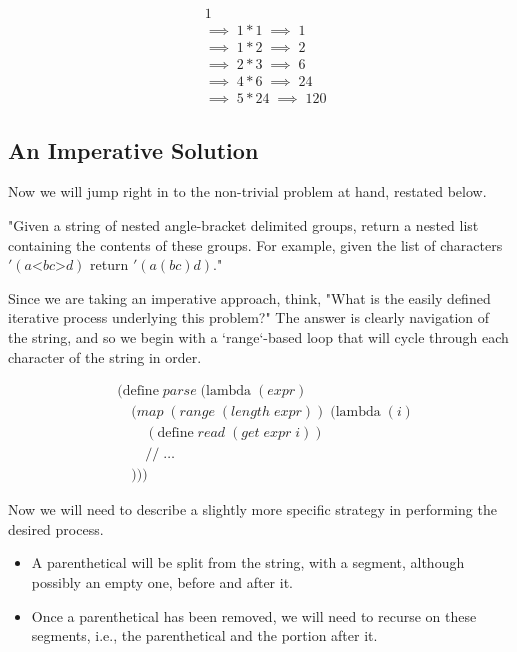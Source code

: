 \begin{align*}
& 1
\\& \implies \; 1*1 \; \implies \; 1
\\& \implies \; 1*2 \; \implies \; 2
\\& \implies \; 2*3 \; \implies \; 6
\\& \implies \; 4*6 \; \implies \; 24
\\& \implies \; 5*24 \; \implies \; 120
\end{align*}

\subsection{An Imperative Solution}
Now we will jump right in to the non-trivial problem at hand, restated below.

"Given a string of nested angle-bracket delimited groups, return a
nested list containing the contents of these groups. For example,
given the list of characters $'(a \text{<} b c \text{>} d)$ return $'(a (b c) d)$."

Since we are taking an imperative approach, think, "What is the easily defined iterative 
process underlying this problem?" The answer is clearly navigation of the string, and so 
we begin with a `range`-based loop that will cycle through each character of the string 
in order.

\begin{align*}
& (\text{define} \; parse \; (\text{lambda} \; (expr) \; 
\\& \quad (map \; (range \; (length \; expr)) \; (\text{lambda} \; (i)
\\& \qquad (\text{define} \; read \; (get \; expr \; i))
\\& \qquad // \; \dots
\\& \quad )))
\end{align*}

Now we will need to describe a slightly more specific strategy in performing the desired 
process.

\begin{itemize}
  \item A parenthetical will be split from the string, with a segment, although possibly an empty one, before and after it.
  \item Once a parenthetical has been removed, we will need to recurse on these segments, i.e., the parenthetical and the portion after it.
\end{itemize}

